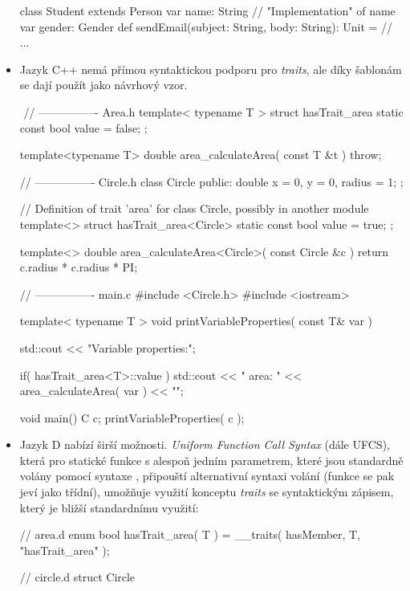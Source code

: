 \begin{itemize}
\begin{scalacode}
class Student extends Person {
	var name: String // "Implementation" of name
	var gender: Gender
	def sendEmail(subject: String, body: String): Unit = {
		// ...
	}
}
	\end{scalacode}

	\item Jazyk C++ nemá přímou syntaktickou podporu pro \textit{traits}, ale díky šablonám se dají použít jako návrhový vzor.
	\begin{cppcode} $\label{traits:1}$
// ---------------- Area.h		
template< typename T >
struct hasTrait_area { static const bool value = false; };

template<typename T>
double area_calculateArea( const T &t ) {
	throw;
}

// ----------------  Circle.h
class Circle {
	public: double x = 0, y = 0, radius = 1;
};

// Definition of trait 'area' for class Circle, possibly in another module
template<>
struct hasTrait_area<Circle> { static const bool value = true; };

template<>
double area_calculateArea<Circle>( const Circle &c ) {
	return c.radius * c.radius * PI;
}

// ----------------  main.c
#include <Circle.h>
#include <iostream>

template< typename T >
void printVariableProperties( const T& var ) {
	std::cout << "Variable properties:\n";
	
	if( hasTrait_area<T>::value )
		std::cout << "  area: " << area_calculateArea( var ) << "\n";
}

void main() {
	C c;
	printVariableProperties( c );
}
	\end{cppcode}

	\item Jazyk D nabízí širší možnosti. \textit{Uniform Function Call Syntax}\cite{BrightUFCS} (dále UFCS), která pro statické funkce s alespoň jedním parametrem, které jsou standardně volány pomocí syntaxe , připouští alternativní syntaxi volání  (funkce se pak jeví jako třídní), umožňuje využití konceptu \textit{traits} se syntaktickým zápisem, který je bližší standardnímu využití:
	\begin{dcode}
// area.d
enum bool hasTrait_area( T ) = __traits( hasMember, T, "hasTrait_area" );

// circle.d
struct Circle {
	
}
\end{dcode}
\end{itemize}
